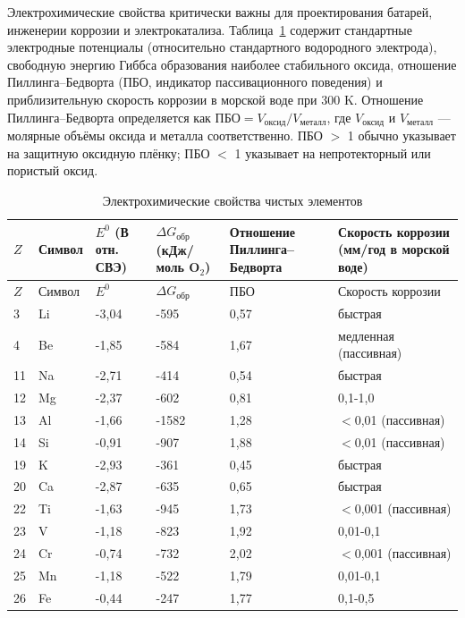 \documentclass[12pt,a4paper]{article}
\begin{document}
	Электрохимические свойства критически важны для проектирования батарей, инженерии коррозии и электрокатализа. Таблица~\ref{tab:electrochemical-properties-func} содержит стандартные электродные потенциалы (относительно стандартного водородного электрода), свободную энергию Гиббса образования наиболее стабильного оксида, отношение Пиллинга–Бедворта (ПБО, индикатор пассивационного поведения) и приблизительную скорость коррозии в морской воде при 300 K. Отношение Пиллинга–Бедворта определяется как \(\text{ПБО} = V_{\text{оксид}} / V_{\text{металл}}\), где \(V_{\text{оксид}}\) и \(V_{\text{металл}}\) — молярные объёмы оксида и металла соответственно. ПБО $>$ 1 обычно указывает на защитную оксидную плёнку; ПБО $<$ 1 указывает на непротекторный или пористый оксид.
	
	\begin{longtable}{p{0.8cm}p{1.2cm}p{2.5cm}p{2.5cm}p{2.5cm}p{2.5cm}}
		\caption{Электрохимические свойства чистых элементов} \label{tab:electrochemical-properties-func} \\
		\toprule
		\(Z\) & Символ & \(E^0\) (В отн. СВЭ) & \(\Delta G_{\text{обр}}\) (кДж/моль O\(_2\)) & Отношение Пиллинга–Бедворта & Скорость коррозии (мм/год в морской воде) \\
		\midrule
		\endfirsthead
		\toprule
		\(Z\) & Символ & \(E^0\) & \(\Delta G_{\text{обр}}\) & ПБО & Скорость коррозии \\
		\midrule
		\endhead
		3  & Li & -3,04 & -595 & 0,57 & быстрая \\
		4  & Be & -1,85 & -584 & 1,67 & медленная (пассивная) \\
		11 & Na & -2,71 & -414 & 0,54 & быстрая \\
		12 & Mg & -2,37 & -602 & 0,81 & 0,1-1,0 \\
		13 & Al & -1,66 & -1582 & 1,28 & $<$0,01 (пассивная) \\
		14 & Si & -0,91 & -907 & 1,88 & $<$0,01 (пассивная) \\
		19 & K  & -2,93 & -361 & 0,45 & быстрая \\
		20 & Ca & -2,87 & -635 & 0,65 & быстрая \\
		22 & Ti & -1,63 & -945 & 1,73 & $<$0,001 (пассивная) \\
		23 & V  & -1,18 & -823 & 1,92 & 0,01-0,1 \\
		24 & Cr & -0,74 & -732 & 2,02 & $<$0,001 (пассивная) \\
		25 & Mn & -1,18 & -522 & 1,79 & 0,01-0,1 \\
		26 & Fe & -0,44 & -247 & 1,77 & 0,1-0,5 \\

\end{longtable}
\end{document}
